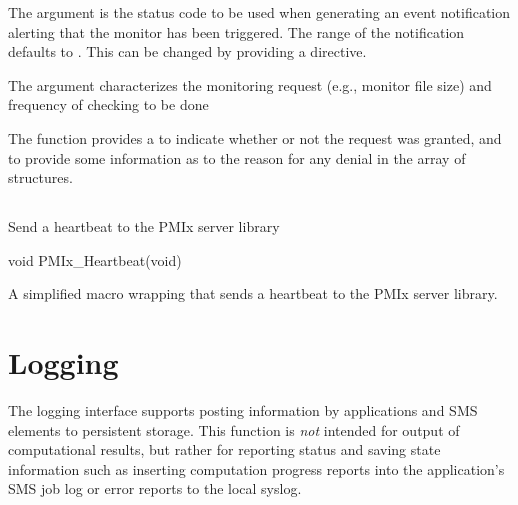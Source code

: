 The  argument is the status code to be used when generating an event notification alerting that the monitor has been triggered.
The range of the notification defaults to .
This can be changed by providing a  directive.

The  argument characterizes the monitoring request (e.g., monitor file size) and frequency of checking to be done

The  function provides a  to indicate whether or not the request was granted, and to provide some information as to the reason for any denial in the  array of  structures.


\subsection{}

\summary

Send a heartbeat to the \ac{PMIx} server library

\format

\cspecificstart
\begin{codepar}
void PMIx_Heartbeat(void)
\end{codepar}
\cspecificend


\descr

A simplified macro wrapping  that sends a heartbeat to the \ac{PMIx} server library.


\section{Logging}
\label{chap:api_job_mgmt:logging}

The logging interface supports posting information by applications and SMS elements to persistent storage. This function is \textit{not} intended for output of computational results, but rather for reporting status and saving state information such as inserting computation progress reports into the application's \ac{SMS} job log or error reports to the local syslog.

\subsection{}

